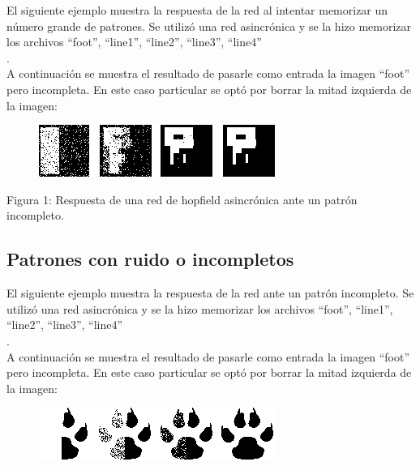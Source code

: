 \documentclass[%
    final,
    reprint,
    notitlepage,
    narroweqnarray,
    inline,
    twoside,
    invited
    ]{ieee}
\begin{document}
\par El siguiente ejemplo muestra la respuesta de la red al intentar memorizar un número grande de patrones. Se utilizó una red asincrónica y se la hizo memorizar los archivos ``foot'', ``line1'', ``line2'', ``line3'', ``line4''\\.\\
A continuación se muestra el resultado de pasarle como entrada la imagen ``foot'' pero incompleta. En este caso particular se optó por borrar la mitad izquierda de la imagen: \\

\begin{figure}[H]
\begin{center}
\includegraphics[scale=0.60]{./images/espureo.png}
\label{modelado}
\end{center}
\end{figure}

\begin{center}
\par Figura 1: Respuesta de una red de hopfield asincrónica ante un patrón incompleto.
\end{center}

\subsection{Patrones con ruido o incompletos}

\par El siguiente ejemplo muestra la respuesta de la red ante un patrón incompleto. Se utilizó una red asincrónica y se la hizo memorizar los archivos ``foot'', ``line1'', ``line2'', ``line3'', ``line4''\\.\\
A continuación se muestra el resultado de pasarle como entrada la imagen ``foot'' pero incompleta. En este caso particular se optó por borrar la mitad izquierda de la imagen: \\

\begin{figure}[H]
\begin{center}
\includegraphics[scale=0.60]{./images/half.png}
\label{modelado}
\end{center}
\end{figure}
\end{document}
